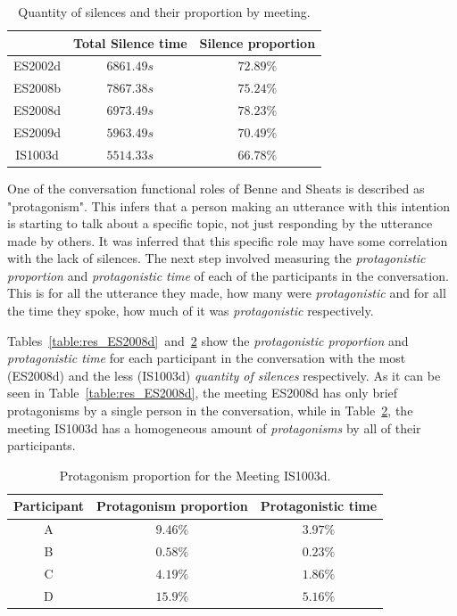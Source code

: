 \begin{table}[H]
    \centering
    \begin{tabular}{ccc}
        \hline    
        & Total Silence time & Silence proportion \\ \hline
        ES2002d & $6861.49s$         & $72.89\%$  \\
        ES2008b & $7867.38s$         & $75.24\%$  \\
        ES2008d & $6973.49s$         & $78.23\%$  \\
        ES2009d & $5963.49s$         & $70.49\%$  \\
        IS1003d & $5514.33s$         & $66.78\%$  \\
        \hline
    \end{tabular}
    \caption{Quantity of silences and their proportion by meeting.}
    \label{table:ami_times}
\end{table}

One of the conversation functional roles of Benne and Sheats is described as "protagonism". This infers that a person making an utterance with this intention is starting to talk about a specific topic, not just responding by the utterance made by others. It was inferred that this specific role may have some correlation with the lack of silences. The next step involved measuring the \textit{protagonistic proportion} and \textit{protagonistic time} of each of the participants in the conversation. This is for all the utterance they made, how many were \textit{protagonistic} and for all the time they spoke, how much of it was \textit{protagonistic} respectively.

Tables~\ref{table:res_ES2008d}~and~\ref{table:res_IS1003d} show the \textit{protagonistic proportion} and \textit{protagonistic time} for each participant in the conversation with the most (ES2008d) and the less (IS1003d) \textit{quantity of silences} respectively. As it can be seen in Table~\ref{table:res_ES2008d}, the meeting ES2008d has only brief protagonisms by a single person in the conversation, while in Table~\ref{table:res_IS1003d}, the meeting IS1003d has a homogeneous amount of \textit{protagonisms} by all of their participants.

\begin{table}[H]
    \centering
    \begin{tabular}{ccc}
    \hline
    Participant & Protagonism proportion & Protagonistic time \\ \hline
    A           & $9.46\%$                & $3.97\%$            \\
    B           & $0.58\%$                & $0.23\%$            \\
    C           & $4.19\%$                & $1.86\%$            \\
    D           & $15.9\%$                & $5.16\%$
             \\
    \hline
    \end{tabular}
    \caption{Protagonism proportion for the Meeting IS1003d.}
    \label{table:res_IS1003d}
\end{table}

